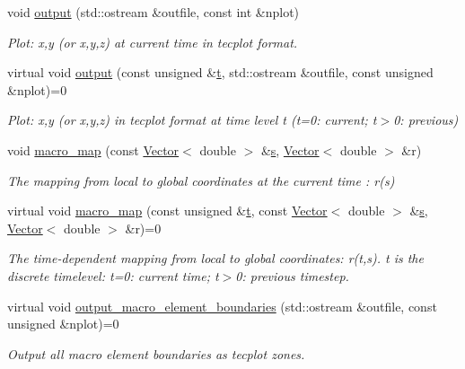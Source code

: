 \begin{DoxyCompactItemize}
void \hyperlink{classoomph_1_1MacroElement_a92030ed18caf4539c9e44e1062457edc}{output} (std\+::ostream \&outfile, const int \&nplot)
\begin{DoxyCompactList}\small\item\em Plot\+: x,y (or x,y,z) at current time in tecplot format. \end{DoxyCompactList}\item 
virtual void \hyperlink{classoomph_1_1MacroElement_a5d3646716d60aedf456889768a3c2dbe}{output} (const unsigned \&\hyperlink{cfortran_8h_af6f0bd3dc13317f895c91323c25c2b8f}{t}, std\+::ostream \&outfile, const unsigned \&nplot)=0
\begin{DoxyCompactList}\small\item\em Plot\+: x,y (or x,y,z) in tecplot format at time level t (t=0\+: current; t$>$0\+: previous) \end{DoxyCompactList}\item 
void \hyperlink{classoomph_1_1MacroElement_a85e7842ad949bb4062a9ff302fa452e5}{macro\+\_\+map} (const \hyperlink{classoomph_1_1Vector}{Vector}$<$ double $>$ \&\hyperlink{cfortran_8h_ab7123126e4885ef647dd9c6e3807a21c}{s}, \hyperlink{classoomph_1_1Vector}{Vector}$<$ double $>$ \&r)
\begin{DoxyCompactList}\small\item\em The mapping from local to global coordinates at the current time \+: r(s) \end{DoxyCompactList}\item 
virtual void \hyperlink{classoomph_1_1MacroElement_a819b095e97c92e634d6216ddce00c8a2}{macro\+\_\+map} (const unsigned \&\hyperlink{cfortran_8h_af6f0bd3dc13317f895c91323c25c2b8f}{t}, const \hyperlink{classoomph_1_1Vector}{Vector}$<$ double $>$ \&\hyperlink{cfortran_8h_ab7123126e4885ef647dd9c6e3807a21c}{s}, \hyperlink{classoomph_1_1Vector}{Vector}$<$ double $>$ \&r)=0
\begin{DoxyCompactList}\small\item\em The time-\/dependent mapping from local to global coordinates\+: r(t,s). t is the discrete timelevel\+: t=0\+: current time; t$>$0\+: previous timestep. \end{DoxyCompactList}\item 
virtual void \hyperlink{classoomph_1_1MacroElement_a748b561313e952c9767d278d0e99be4e}{output\+\_\+macro\+\_\+element\+\_\+boundaries} (std\+::ostream \&outfile, const unsigned \&nplot)=0
\begin{DoxyCompactList}\small\item\em Output all macro element boundaries as tecplot zones. \end{DoxyCompactList}\item 

\end{DoxyCompactItemize}
